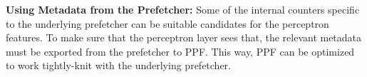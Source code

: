 \noindent \textbf{Using Metadata from the Prefetcher:} Some of the 
internal counters specific to the underlying prefetcher can be suitable candidates
for the perceptron features. To make sure that the perceptron layer sees that, 
the relevant metadata must be exported from the prefetcher to PPF. This way,
PPF can be optimized to work tightly-knit with the {\color{red}underlying} prefetcher.


